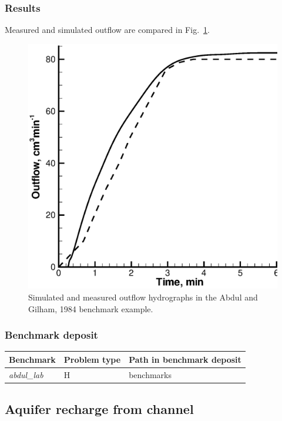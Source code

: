 %

%
\subsubsection*{Results}
%
Measured and simulated outflow are compared in Fig.~\ref{coup:abdul_results}.

\begin{figure} [htb!]
 \centering
\includegraphics[width=0.75\columnwidth] {H_COUP/figures/abdul_results.eps}
\caption{Simulated and measured outflow hydrographs in the Abdul and Gilham, 1984 \cite{Abdul:84} benchmark example.}
 \label{coup:abdul_results}
\end{figure}
%
\subsubsection*{Benchmark deposit}
%
\begin{tabular}{|l|l|l|}
  \hline
  Benchmark & Problem type & Path in benchmark deposit \\
  \hline
  \emph{abdul\_lab} & H & benchmarks\verb \COUPLED_FLOW\ \\
  \hline
\end{tabular}
%
%
%
\subsection{Aquifer recharge from channel}
%
